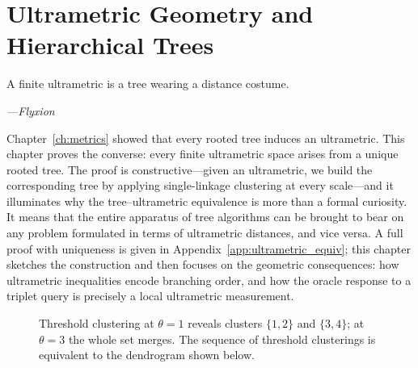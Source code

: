 \chapter{Ultrametric Geometry and Hierarchical Trees}
\label{ch:ultrametric}

\epigraph{%
  A finite ultrametric is a tree wearing a distance costume.%
}{\textit{---Flyxion}}

Chapter~\ref{ch:metrics} showed that every rooted tree induces an ultrametric. This chapter proves the converse: every finite ultrametric space arises from a unique rooted tree. The proof is constructive---given an ultrametric, we build the corresponding tree by applying single-linkage clustering at every scale---and it illuminates why the tree--ultrametric equivalence is more than a formal curiosity. It means that the entire apparatus of tree algorithms can be brought to bear on any problem formulated in terms of ultrametric distances, and vice versa. A full proof with uniqueness is given in Appendix~\ref{app:ultrametric_equiv}; this chapter sketches the construction and then focuses on the geometric consequences: how ultrametric inequalities encode branching order, and how the oracle response to a triplet query is precisely a local ultrametric measurement.

\begin{figure}[ht]
\centering
\caption{Threshold clustering at $\theta=1$ reveals clusters $\{1,2\}$ and $\{3,4\}$; at $\theta=3$ the whole set merges. The sequence of threshold clusterings is equivalent to the dendrogram shown below.}
\label{fig:threshold_cluster}
\end{figure}

